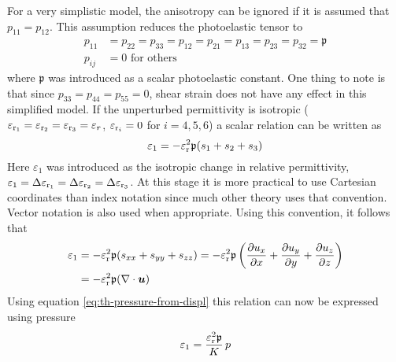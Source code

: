 \documentclass[11pt,twoside]{eitExjobb}
\begin{document}
	For a very simplistic model, the anisotropy can be ignored if it is assumed that $p_{11} = p_{12}$. This assumption reduces the photoelastic tensor to
	\begin{equation*}
	\begin{split}
		p_{11} &= p_{22} = p_{33} = p_{12} = p_{21} = p_{13} = p_{23} = p_{32} = \mathfrak{p}\\
		p_{ij} &= 0 \text{ for others}
	\end{split}
	\end{equation*}
	where $\mathfrak{p}$ was introduced as a scalar photoelastic constant. One thing to note is that since $p_{33} = p_{44} = p_{55} = 0$, shear strain does not have any effect in this simplified model. If the unperturbed permittivity is isotropic ($\varepsilon_{\mathrm{r}_1} = \varepsilon_{\mathrm{r}_2} = \varepsilon_{\mathrm{r}_3} = \varepsilon_r$, $\varepsilon_{\mathrm{r}_i} = 0$ for $i=4,5,6$) a scalar relation can be written as
	\begin{equation*}
		\varepsilon_1 = -\varepsilon_{\mathrm{r}}^2 \mathfrak{p} (s_1 + s_2 + s_3)
	\end{equation*}
	Here $\varepsilon_1$ was introduced as the isotropic change in relative permittivity, $\varepsilon_1 = \Delta \varepsilon_{\mathrm{r}_1} = \Delta \varepsilon_{\mathrm{r}_2} = \Delta \varepsilon_{\mathrm{r}_3}$. At this stage it is more practical to use Cartesian coordinates than index notation since much other theory uses that convention. Vector notation is also used when appropriate. Using this convention, it follows that
	\begin{equation}
	\begin{split}
		\varepsilon_1 &= -\varepsilon_{\mathrm{r}}^2 \mathfrak{p} (s_{xx} + s_{yy} + s_{zz}) = -\varepsilon_{\mathrm{r}}^2 \mathfrak{p} \left( \frac{\partial u_x}{\partial x} + \frac{\partial u_y}{\partial y} + \frac{\partial u_z}{\partial z} \right) \\
		&= -\varepsilon_{\mathrm{r}}^2 \mathfrak{p} (\nabla \cdot \bm{u})
	\end{split}
	\label{eq:th-PE-scalar}
	\end{equation}
	Using equation \eqref{eq:th-pressure-from-displ} this relation can now be expressed using pressure
	\begin{equation}
		\varepsilon_1 = \frac{\varepsilon_{\mathrm{r}}^2 \mathfrak{p}}{K} \,p
		\label{eq:th-PE-scalar-p}
	\end{equation}
	
\end{document}
